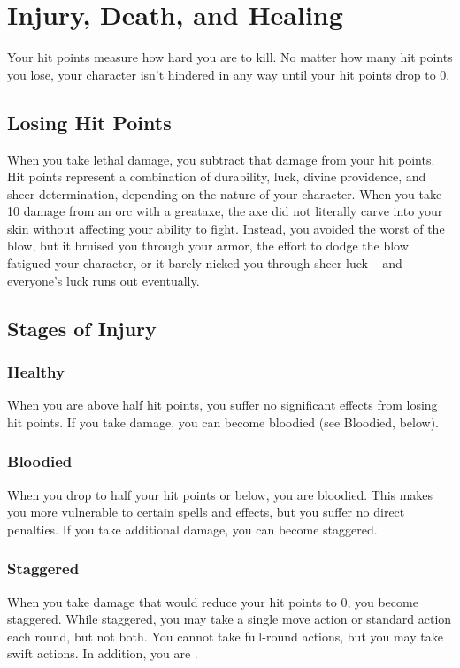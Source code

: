 \section{Injury, Death, and Healing}\label{Injury, Death, and Healing}
Your hit points measure how hard you are to kill. No matter how many hit points you lose, your character isn't hindered in any way until your hit points drop to 0.

\subsection{Losing Hit Points}
When you take lethal damage, you subtract that damage from your hit points.
 Hit points represent a combination of durability, luck, divine providence, and sheer determination, depending on the nature of your character. When you take 10 damage from an orc with a greataxe, the axe did not literally carve into your skin without affecting your ability to fight. Instead, you avoided the worst of the blow, but it bruised you through your armor, the effort to dodge the blow fatigued your character, or it barely nicked you through sheer luck -- and everyone's luck runs out eventually.

\subsection{Stages of Injury}

\subsubsection{Healthy} 
When you are above half hit points, you suffer no significant effects from losing hit points. If you take damage, you can become bloodied (see Bloodied, below).

\subsubsection{Bloodied}
When you drop to half your hit points or below, you are bloodied. This makes you more vulnerable to certain spells and effects, but you suffer no direct penalties. If you take additional damage, you can become staggered.

\subsubsection{Staggered}
When you take damage that would reduce your hit points to 0, you become staggered. While staggered, you may take a single move action or standard action each round, but not both. You cannot take full-round actions, but you may take swift actions. In addition, you are \vulnerable.

